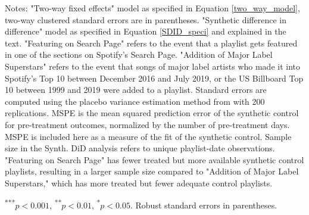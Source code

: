 \begin{table}[t!]
\caption{Model estimates.}
\label{tab:model_results}
\smallskip{}

\raggedright{}%
\begin{center}
\begin{flushleft}
   \vspace{-0.3cm}
   \footnotesize{
    Notes: "Two-way fixed effects" model as specified in Equation \ref{two_way_model}, two-way clustered standard errors are in parentheses. "Synthetic difference in difference" model as specified in Equation \ref{SDID_speci} and explained in the text. "Featuring on Search Page" refers to the event that a playlist gets featured in one of the sections on Spotify's Search Page. "Addition of Major Label Superstars" refers to the event that songs of major label artists who made it into Spotify's Top 10 between December 2016 and July 2019, or the US Billboard Top 10 between 1999 and 2019 were added to a playlist. Standard errors are computed using the placebo variance estimation method from \cite{SDiD_AER_Arkhangelsky_21} with 200 replications. MSPE is the mean squared prediction error of the synthetic control for pre-treatment outcomes, normalized by the number of pre-treatment days. MSPE is included here as a measure of the fit of the synthetic control. Sample size in the Synth. DiD analysis refers to unique playlist-date observations. "Featuring on Search Page" has fewer treated but more available synthetic control playlists, resulting in a larger sample size compared to "Addition of Major Label Superstars," which has more treated but fewer adequate control playlists.}
\end{flushleft}
\begin{flushleft}
  \vspace{-0.3cm}
  \footnotesize{
  \textsuperscript{***}$p<0.001$, 
  \textsuperscript{**}$p<0.01$, 
  \textsuperscript{*}$p<0.05$. Robust standard errors in parentheses.}
\end{flushleft}
\end{center}
    
\end{table}
